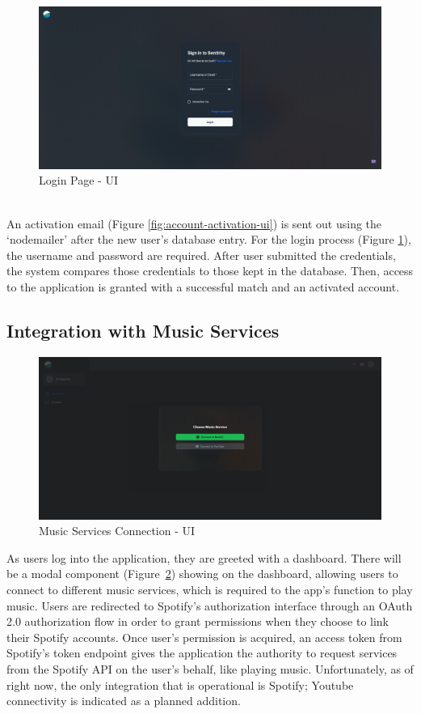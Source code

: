 \begin{figure}[h!]
    \centering
    \includegraphics[width=14cm]{Images/login-ui.png}
    \caption{Login Page - UI}
    \label{fig:login-page-ui}
\end{figure}
\\
\indent An activation email (Figure \ref{fig:account-activation-ui}) is sent out using the `nodemailer' after the new user's database entry.
For the login process (Figure \ref{fig:login-page-ui}), the username and password are required.
After user submitted the credentials, the system compares those credentials to those kept in the database. 
Then, access to the application is granted with a successful match and an activated account.
\\
\subsection{Integration with Music Services}
\begin{figure}[h!]
    \centering
    \includegraphics[width=14cm]{Images/connect-api.png}
    \caption{Music Services Connection - UI}
    \label{fig:music-service}
\end{figure}
As users log into the application, they are greeted with a dashboard.
There will be a modal component (Figure~\ref{fig:music-service}) showing on the dashboard, allowing users to connect to different music services, which is required to the app's function to play music.
Users are redirected to Spotify's authorization interface through an OAuth 2.0 authorization flow in order to grant permissions when they choose to link their Spotify accounts.
Once user's permission is acquired, an access token from Spotify's token endpoint gives the application the authority to request services from the Spotify API on the user's behalf, like playing music.
Unfortunately, as of right now, the only integration that is operational is Spotify; Youtube connectivity is indicated as a planned addition.
\\
